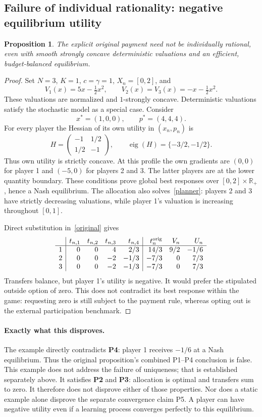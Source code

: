 \documentclass[11pt]{article}
\newtheorem{proposition}[theorem]{Proposition}
\newcommand{\R}{\mathbb R}
\begin{document}
\subsection{Failure of individual rationality: negative equilibrium utility}
\begin{proposition}\label{counterexample}
The explicit original payment need not be individually rational, even
with smooth strongly concave deterministic valuations and an efficient,
budget-balanced equilibrium.
\end{proposition}
\begin{proof}
Set $N=3$, $K=1$, $c=\gamma=1$, $X_n=[0,2]$, and
\[
 V_1(x)=5x-\tfrac12x^2,\qquad
 V_2(x)=V_3(x)=-x-\tfrac12x^2.
\]
These valuations are normalized and $1$-strongly concave. Deterministic
valuations satisfy the stochastic model as a special case. Consider
\[
 x^*=(1,0,0),\qquad p^*=(4,4,4).
\]
For every player the Hessian of its own utility in $(x_n,p_n)$ is
\[
 H=\begin{pmatrix}-1&1/2\\1/2&-1\end{pmatrix},
 \qquad \operatorname{eig}(H)=\{-3/2,-1/2\}.
\]
Thus own utility is strictly concave. At this profile the own gradients
are $(0,0)$ for player 1 and $(-5,0)$ for players 2 and 3.
The latter players are at the lower quantity boundary. These conditions
prove global best responses over $[0,2]\times\R_+$, hence a Nash
equilibrium. The allocation also solves~\eqref{planner}: players 2 and
3 have strictly decreasing valuations, while player 1's valuation is
increasing throughout $[0,1]$.

Direct substitution in~\eqref{original} gives
\[
\begin{array}{c|rrrr|rrr}
 &t_{n,1}&t_{n,2}&t_{n,3}&t_{n,4}&t_n^{\rm orig}&V_n&U_n\\\hline
 1&0&0&4&2/3&14/3&9/2&-1/6\\
 2&0&0&-2&-1/3&-7/3&0&7/3\\
 3&0&0&-2&-1/3&-7/3&0&7/3
\end{array}
\]
Transfers balance, but player 1's utility is negative. It would prefer
the stipulated outside option of zero. This does not contradict its
best response within the game: requesting zero is still subject to the
payment rule, whereas opting out is the external participation benchmark.
\end{proof}

\paragraph{Exactly what this disproves.}
The example directly contradicts \textbf{P4}: player 1 receives $-1/6$
at a Nash equilibrium. Thus the original proposition's combined
P1--P4 conclusion is false. This example does not address the failure of uniqueness; that is
established separately above.
It satisfies \textbf{P2} and \textbf{P3}: allocation
is optimal and transfers sum to zero. It therefore does not disprove
either of those properties. Nor does a static example alone disprove
the separate convergence claim P5. A player can have negative utility
even if a learning process converges perfectly to this equilibrium.
\end{document}
